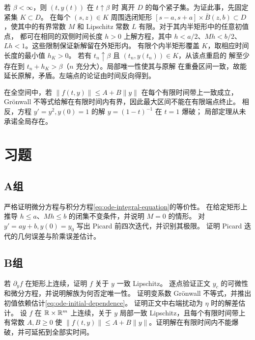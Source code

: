 若 \(\beta<\infty\)，则 \((t,y(t))\) 在 \(t\uparrow\beta\) 时
离开 \(D\) 的每个紧子集。为证此事，先固定紧集 \(K\subset D\)。
在每个 \((s,z)\in K\) 周围选闭矩形
\([s-a,s+a]\times\overline B(z,b)\subset D\)，使其中的有界常数
\(M\) 和 Lipschitz 常数 \(L\) 有限。对于其内半矩形中的任意初值点，
都可在相同的双侧时间长度 \(h>0\) 上解方程，其中
\(h<a/2\)、\(Mh<b/2\)、\(Lh<1\)。这些限制保证新解留在外矩形内。
有限个内半矩形覆盖 \(K\)，取相应时间长度的最小值 \(h_K>0\)。
若有 \(t_n\uparrow\beta\) 且 \((t_n,y(t_n))\in K\)，从该点重启的
解至少存在到 \(t_n+h_K>\beta\)（\(n\) 充分大）。局部唯一性使其与原解
在重叠区间一致，故能延长原解，矛盾。左端点的论证由时间反向得到。

在全空间中，若 \(\|f(t,y)\|\le A+B\|y\|\) 在每个有限时间带上一致成立，
Grönwall 不等式给解在有限时间内有界，因此最大区间不能在有限端点终止。
相反，方程 \(y'=y^2,y(0)=1\) 的解 \(y=(1-t)^{-1}\) 在 \(t=1\) 爆破；
局部定理从未承诺全局存在。

\section*{习题}
\subsection*{A组}
\begin{enumerate}[label=\textbf{\thechapter.\arabic*.}]
严格证明微分方程与积分方程\eqref{eq:ode-integral-equation}的等价性。
在给定矩形上推导 \(h\le a\)、\(Mh\le b\) 的闭集不变条件，并说明 \(M=0\) 的情形。
对 \(y'=ay+b,y(0)=y_0\) 写出 Picard 前四次迭代，并识别其极限。
证明 Picard 迭代的几何误差与阶乘误差估计。
\end{enumerate}
\subsection*{B组}
\begin{enumerate}[label=\textbf{\thechapter.\arabic*.},resume]
若 \(\partial_yf\) 在矩形上连续，证明 \(f\) 关于 \(y\) 一致 Lipschitz。
逐点验证正文 \(y_c\) 的可微性和微分方程，并说明解族为何否定唯一性。
证明变系数 Grönwall 不等式，并推出初值依赖估计\eqref{eq:ode-initial-dependence}。
证明正文中右端扰动为 \(\eta\) 时的解差估计。
设 \(f\) 在 \(\mathbb{R}\times\mathbb{R}^m\) 上连续，关于 \(y\) 局部一致 Lipschitz，且每个有限时间带上有常数 \(A,B\ge0\) 使 \(\|f(t,y)\|\le A+B\|y\|\)。证明解在有限时间内不能爆破，并可延拓到全部实时间。
\end{enumerate}
